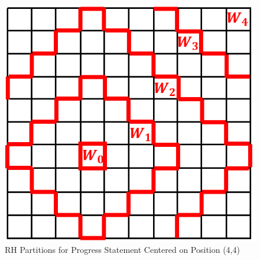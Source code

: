\documentclass[journal]{IEEEtran}
\newcommand{\always}{\square}
\begin{document}
%





\begin{figure}
	\includegraphics[width = 0.8 \linewidth]{WPartitionPic}
	\centering
	\caption{RH Partitions for Progress Statement Centered on Position (4,4)}
	\label{fig:circuit2}
\end{figure}
\end{document}
